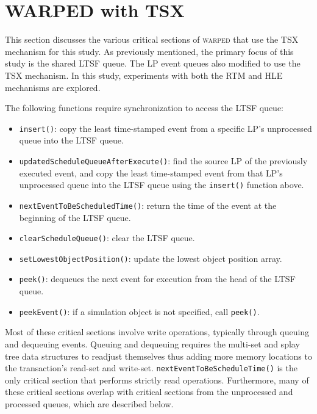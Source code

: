 \documentclass{sig-alternate}
\begin{document}
\section{WARPED with TSX}\label{tsx}

This section discusses the various critical sections of \textsc{warped} that use the TSX
mechanism for this study.  As previously mentioned, the primary focus of this study is the
shared LTSF queue.  The LP event queues also modified to use the TSX mechanism.  In
this study, experiments with both the RTM and HLE mechanisms are explored.

The following functions require synchronization to access the LTSF queue:

\begin{itemize}
    \item\texttt{insert()}: copy the least time-stamped event from a specific LP's
      unprocessed queue into the LTSF queue.
  \item\texttt{updatedScheduleQueueAfterExecute()}: find the source LP of the previously
    executed event, and copy the least time-stamped event from that LP's unprocessed queue
    into the LTSF queue using the \texttt{insert()} function above.
  \item\texttt{nextEventToBeScheduledTime()}: return the time of the event at the
    beginning of the LTSF queue.
  \item\texttt{clearScheduleQueue()}: clear the LTSF queue.
  \item\texttt{setLowestObjectPosition()}: update the lowest object position array.
  \item\texttt{peek()}: dequeues the next event for execution from the head of the LTSF
    queue.
  \item\texttt{peekEvent()}: if a simulation object is not specified, call \texttt{peek()}. 
  \end{itemize}

Most of these critical sections involve write operations, typically through queuing and
dequeuing events.  Queuing and dequeuing requires the multi-set and splay tree data
structures to readjust themselves thus adding more memory locations to the transaction's
read-set and write-set.  \texttt{nextEventToBeScheduleTime()} is the only critical section
that performs strictly read operations.  Furthermore, many of these critical sections
overlap with critical sections from the unprocessed and processed queues, which are
described below.

\end{document}
